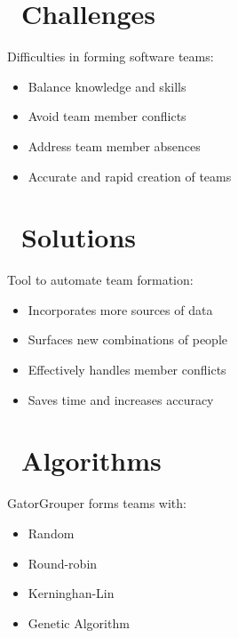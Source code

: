 \documentclass[a0paper,fleqn]{betterposter}
\begin{document}
{  %

  \vspace*{-.25in}
  \section{\faCube~Challenges}
  Difficulties in forming software teams:
  \begin{itemize}
    \item Balance knowledge and skills
    \item Avoid team member conflicts
    \item Address team member absences
    \item Accurate and rapid creation of teams
  \end{itemize}

  \vspace*{-.25in}
  \section{\faTrophy~Solutions}
  Tool to automate team formation:
  \begin{itemize}
    \item Incorporates more sources of data
    \item Surfaces new combinations of people
    \item Effectively handles member conflicts
    \item Saves time and increases accuracy
  \end{itemize}

  \vspace*{-.25in}
  \section{\faCog~Algorithms}
  GatorGrouper forms teams with:
  \begin{itemize}
    \item Random
    \item Round-robin
    \item Kerninghan-Lin
    \item Genetic Algorithm
  \end{itemize}

}
\end{document}
